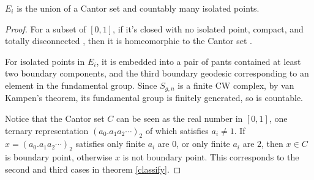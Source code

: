 \begin{theorem}\label{Cantorset}
$E_i$ is the  union of a Cantor set and countably many isolated points.
\end{theorem}
\begin{proof}
For a subset of $[0,1]$, if it's closed with no isolated point, compact, and  totally disconnected , then 
 it is  homeomorphic to the Cantor set \cite{topologycantor} .
 
 
For isolated points in $E_i$, it is embedded into a pair of pants contained at least two boundary components, and the third boundary geodesic corresponding to  an element in the fundamental group. Since $S_{g,n}$ is a finite CW complex, by van Kampen's theorem, its fundamental group is finitely generated, so is countable.   

Notice that the Cantor set $C$ can be seen as the real number in $[0,1]$, one ternary representation $(a_0.a_1a_2\cdots)_2$ of which satisfies $a_i\neq 1$.  If $x=(a_0.a_1a_2\cdots)_2$  satisfies  only finite $a_i$ are $0$, or only finite $a_i$ are $2$, then $x\in C$ is boundary point, otherwise $x$ is not boundary point.  This corresponds to the second and third cases in theorem \ref{classify}.
\end{proof}



